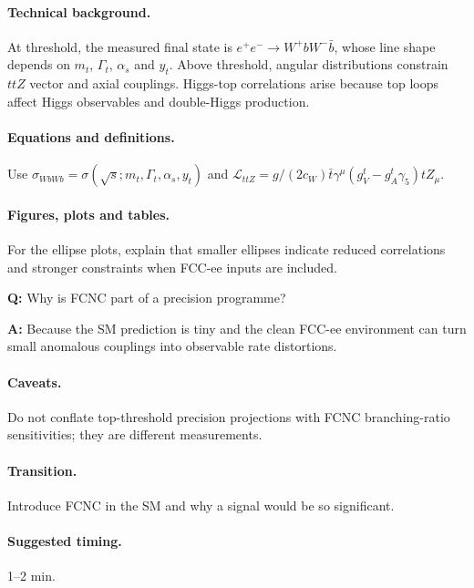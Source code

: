 \documentclass[11pt,a4paper]{report}
\newcommand{\ee}{e^+e^-}
\begin{document}
\paragraph{Technical background.}
At threshold, the measured final state is $\ee\to W^+bW^-\bar b$, whose line shape depends on $m_t$, $\Gamma_t$, $\alpha_s$ and $y_t$.  Above threshold, angular distributions constrain $ttZ$ vector and axial couplings.  Higgs-top correlations arise because top loops affect Higgs observables and double-Higgs production.

\paragraph{Equations and definitions.}
Use $\sigma_{WbWb}=\sigma(\sqrt{s};m_t,\Gamma_t,\alpha_s,y_t)$ and $\mathcal L_{ttZ}=g/(2c_W)\bar t\gamma^\mu(g_V^t-g_A^t\gamma_5)tZ_\mu$.

\paragraph{Figures, plots and tables.}
For the ellipse plots, explain that smaller ellipses indicate reduced correlations and stronger constraints when FCC-ee inputs are included.

\begin{questionbox}
\textbf{Q:} Why is FCNC part of a precision programme?\par
\textbf{A:} Because the SM prediction is tiny and the clean FCC-ee environment can turn small anomalous couplings into observable rate distortions.
\end{questionbox}

\paragraph{Caveats.}
Do not conflate top-threshold precision projections with FCNC branching-ratio sensitivities; they are different measurements.

\paragraph{Transition.}
Introduce FCNC in the SM and why a signal would be so significant.

\paragraph{Suggested timing.}
1--2 min.
\end{document}
